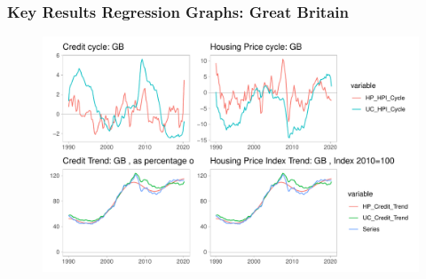 \documentclass[10pt]{beamer}
\begin{document}


\begin{frame}
	\frametitle{Key Results Regression Graphs: Great Britain}
	
	\begin{figure}[H]
		\begin{minipage}{0.95\textwidth} %
			\includegraphics[scale=0.5]{../Regression/VAR_2/Output/Graphs/Combined_GB}
		\end{minipage}
	\end{figure}
	
\end{frame}





\end{document}

